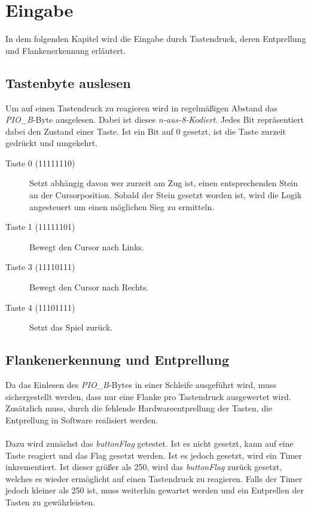 \newpage
\section{Eingabe}
    In dem folgenden Kapitel wird die Eingabe durch Tastendruck, deren Entprellung und Flankenerkennung erläutert.
    
    \subsection{Tastenbyte auslesen}
        Um auf einen Tastendruck zu reagieren wird in regelmäßigen Abstand das \textit{PIO\_B}-Byte ausgelesen.
        Dabei ist dieses \textit{n-aus-8-Kodiert}. Jedes Bit repräsentiert dabei den Zustand einer Taste.
        Ist ein Bit auf 0 gesetzt, ist die Taste zurzeit gedrückt und umgekehrt.

        \begin{description}
            \item [Taste 0 (11111110)]
            Setzt abhängig davon wer zurzeit am Zug ist, einen entsprechenden Stein an der Cursorposition.
            Sobald der Stein gesetzt worden ist, wird die Logik angesteuert um einen möglichen Sieg zu ermitteln.
            \item [Taste 1 (11111101)] Bewegt den Cursor nach Links.
            \item [Taste 3 (11110111)] Bewegt den Cursor nach Rechts.
            \item [Taste 4 (11101111)] Setzt das Spiel zurück.
        \end{description}


    \subsection{Flankenerkennung und Entprellung}
        Da das Einlesen des \textit{PIO\_B}-Bytes in einer Schleife ausgeführt wird,
        muss sichergestellt werden, dass nur eine Flanke pro Tastendruck ausgewertet wird.
        Zusätzlich muss, durch die fehlende Hardwareentprellung der Tasten, die Entprellung in Software realisiert werden.
        \\
        \\
        Dazu wird zunächst das \textit{buttonFlag} getestet. Ist es nicht gesetzt, kann auf eine Taste reagiert und
        das Flag gesetzt werden. Ist es jedoch gesetzt, wird ein Timer inkrementiert.
        Ist dieser größer als 250, wird das \textit{buttonFlag} zurück gesetzt,
        welches es wieder ermöglicht auf einen Tastendruck zu reagieren.
        Falls der Timer jedoch kleiner als 250 ist, muss weiterhin gewartet werden und ein Entprellen der Tasten
        zu gewährleisten.

